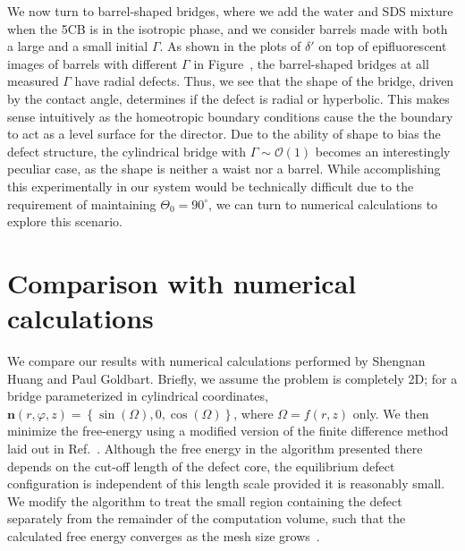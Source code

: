 We now turn to barrel-shaped bridges, where we add the water and SDS mixture when the 5CB is in the isotropic phase, and we consider barrels made with both a large and a small initial $\Gamma$.
As shown in the plots of $\delta'$ on top of epifluorescent images of barrels with different $\Gamma$ in Figure~, the barrel-shaped bridges at all measured $\Gamma$ have radial defects.
Thus, we see that the shape of the bridge, driven by the contact angle, determines if the defect is radial or hyperbolic.
This makes sense intuitively as the homeotropic boundary conditions cause the the boundary to act as a level surface for the director.
Due to the ability of shape to bias the defect structure, the cylindrical bridge with $\Gamma \sim \mathcal{O}\left (1 \right )$ becomes an interestingly peculiar case, as the shape is neither a waist nor a barrel.
While accomplishing this experimentally in our system would be technically difficult due to the requirement of maintaining $\Theta_0 = 90^{\circ}$, we can turn to numerical calculations to explore this scenario.




\section{Comparison with numerical calculations}
We compare our results with numerical calculations performed by Shengnan Huang and Paul Goldbart.
Briefly, we assume the problem is completely 2D; for a bridge parameterized in cylindrical coordinates, $\mathbf{n}(r,\varphi,z) = \left \{ \sin(\Omega), 0, \cos(\Omega)   \right \}$, where $\Omega = f(r,z)$ only.
We then minimize the free-energy using a modified version of the finite difference method laid out in Ref.~\cite{RN144}.
Although the free energy in the algorithm presented there depends on the cut-off length of the defect core, the equilibrium defect configuration is independent of this length scale provided it is reasonably small.
We modify the algorithm to treat the small region containing the defect separately from the remainder of the computation volume, such that the calculated free energy converges as the mesh size grows~\cite{RN199,RN200,RN201}.

